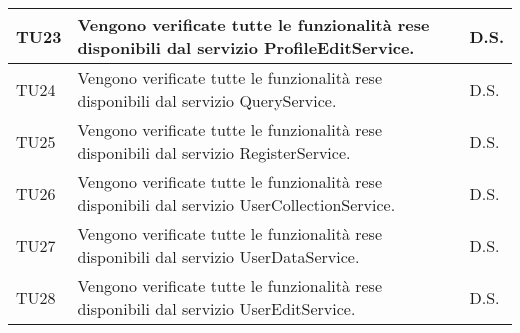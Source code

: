 \begin{center}
\begin{longtable}{|p{2cm}|p{7cm}|p{2cm}|}
\midrule
TU23
& Vengono verificate tutte le funzionalità rese disponibili dal servizio ProfileEditService.
& D.S.\\


\midrule
TU24
& Vengono verificate tutte le funzionalità rese disponibili dal servizio QueryService.
& D.S.\\


\midrule
TU25
& Vengono verificate tutte le funzionalità rese disponibili dal servizio RegisterService.
& D.S.\\


\midrule
TU26
& Vengono verificate tutte le funzionalità rese disponibili dal servizio UserCollectionService.
& D.S.\\

\midrule
TU27
& Vengono verificate tutte le funzionalità rese disponibili dal servizio UserDataService.
& D.S.\\

\midrule
TU28
& Vengono verificate tutte le funzionalità rese disponibili dal servizio UserEditService.
& D.S.\\



\end{longtable}
\end{center}


